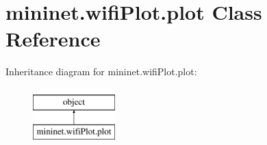 \hypertarget{classmininet_1_1wifiPlot_1_1plot}{\section{mininet.\-wifi\-Plot.\-plot Class Reference}
\label{classmininet_1_1wifiPlot_1_1plot}
}
Inheritance diagram for mininet.\-wifi\-Plot.\-plot\-:\begin{figure}[H]
\begin{center}
\leavevmode
\includegraphics[height=2.000000cm]{classmininet_1_1wifiPlot_1_1plot}
\end{center}
\end{figure}
